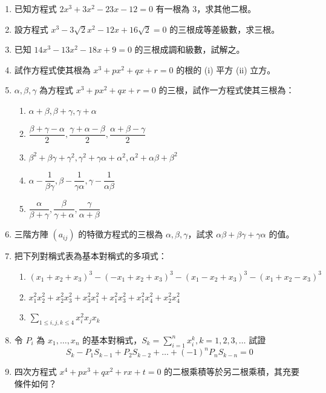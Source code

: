\begin{enumerate}[label=\arabic*., leftmargin=2em]
  \item 已知方程式 $2x^3+3x^2-23x-12=0$ 有一根為 3，求其他二根。
  \item 設方程式 $x^3-3\sqrt{2}x^2-12x+16\sqrt{2}=0$ 的三根成等差級數，求三根。
  \item 已知 $14x^3-13x^2-18x+9=0$ 的三根成調和級數，試解之。
  \item 試作方程式使其根為 $x^3+px^2+qx+r=0$ 的根的 (i) 平方 (ii) 立方。
  \item $\alpha, \beta, \gamma$ 為方程式 $x^3+px^2+qx+r=0$ 的三根，試作一方程式使其三根為：
  \begin{enumerate}[label=(\roman*)]
    \item $\alpha+\beta, \beta+\gamma, \gamma+\alpha$
    \item $\dfrac{\beta+\gamma-\alpha}{2}, \dfrac{\gamma+\alpha-\beta}{2}, \dfrac{\alpha+\beta-\gamma}{2}$
    \item $\beta^2+\beta\gamma+\gamma^2, \gamma^2+\gamma\alpha+\alpha^2, \alpha^2+\alpha\beta+\beta^2$
    \item $\alpha - \dfrac{1}{\beta\gamma}, \beta - \dfrac{1}{\gamma\alpha}, \gamma - \dfrac{1}{\alpha\beta}$
    \item $\dfrac{\alpha}{\beta+\gamma}, \dfrac{\beta}{\gamma+\alpha}, \dfrac{\gamma}{\alpha+\beta}$
  \end{enumerate}
  \item 三階方陣 $(a_{ij})$ 的特徵方程式的三根為 $\alpha, \beta, \gamma$，試求 $\alpha\beta+\beta\gamma+\gamma\alpha$ 的值。
  \item 把下列對稱式表為基本對稱式的多項式：
  \begin{enumerate}[label=(\roman*)]
    \item $(x_1+x_2+x_3)^3 - (-x_1+x_2+x_3)^3 - (x_1-x_2+x_3)^3 - (x_1+x_2-x_3)^3$
    \item $x_1^2 x_2^2 + x_2^2 x_3^2 + x_3^2 x_1^2 + x_1^2 x_3^2 + x_1^2 x_4^2 + x_2^2 x_4^2$
    \item $\sum_{1 \le i, j, k \le 4} x_i^2 x_j x_k$
  \end{enumerate}
  \item 令 $P_i$ 為 $x_1, \dots, x_n$ 的基本對稱式，$S_k = \sum_{i=1}^n x_i^k, k=1, 2, 3, \dots$ 試證
  \[ S_k - P_1 S_{k-1} + P_2 S_{k-2} + \dots + (-1)^n P_n S_{k-n} = 0 \]
  \item 四次方程式 $x^4+px^3+qx^2+rx+t=0$ 的二根乘積等於另二根乘積，其充要條件如何？
\end{enumerate}

